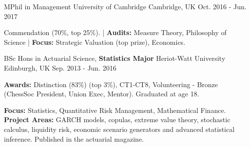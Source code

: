 

\begin{cventries}
  \cventry
    {MPhil in Management} %
    {University of Cambridge} %
    {Cambridge, UK} %
    {Oct. 2016 - Jun. 2017} %
    {
      \begin{cvitems} %
        \item {Commendation (70\%, top 25\%). | \textbf{Audits:} Measure Theory, Philosophy of Science | \textbf{Focus:} Strategic Valuation (top prize), Economics.}
      \end{cvitems}
    }

  \cventry
    {BSc Hons in Actuarial Science, \textbf{Statistics Major}} %
    {Heriot-Watt University} %
    {Edinburgh, UK} %
    {Sep. 2013 - Jun. 2016} %
    {
      \begin{cvitems} %
        \item {\textbf{Awards:} Distinction (83\%) (top 3\%), CT1-CT8, Volunteering - Bronze (ChessSoc President, Union Exec, Mentor). Graduated at age 18.}
        \item {\textbf{Focus:} Statistics, Quantitative Risk Management, Mathematical Finance. \textbf{Project Areas:} GARCH models, copulas, extreme value theory, stochastic calculus, liquidity risk, economic scenario generators and advanced statistical inference. Published in the actuarial magazine.}
      \end{cvitems}
    }

\end{cventries}
